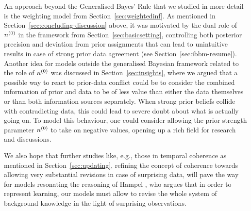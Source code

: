 An approach beyond the Generalised Bayes' Rule that we studied in more detail
is the weighting model from Section~\ref{sec:weightedinf}.
As mentioned in Section~\ref{sec:concluding-discussion} above,
it was motivated by the dual role of $n^{(0)}$ in the framework from Section~\ref{sec:basicsetting},
controlling both posterior precision and deviation from prior assignments
that can lead to unintuitive results in case of strong prior data agreement (see Section~\ref{sec:ibbm-resume}).
Another idea for models outside the generalised Bayesian framework
related to the role of $n^{(0)}$ was discussed in Section~\ref{sec:insights},
where we argued that a possible way to react to prior-data
conflict could be to consider the combined information of prior and data
to be of less value than either the data themselves
or than both information sources separately.
When strong prior beliefs collide with contradicting data,
this could lead to severe doubt about what is actually going on.
To model this behaviour, one could consider allowing the prior strength parameter $n^{(0)}$
to take on negative values, opening up a rich field for research and discussions.


We also hope that further studies like, e.g., those in temporal coherence as mentioned in Section~\ref{sec:updating},
refining the concept of coherence towards allowing very substantial revisions in case of surprising data, %
will pave the way for models resonating the %
reasoning of Hampel \parencite*{2009:hampel:knowledge,2011:hampel},
who argues that in order to represent learning,
our models must allow to revise 
the whole system of background knowledge 
in the light of surprising observations.












